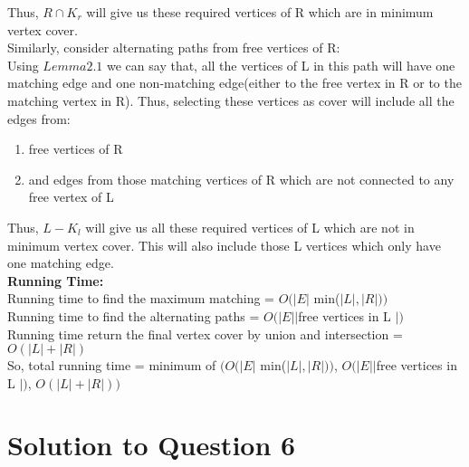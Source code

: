 \documentclass[11pt]{article}
\begin{document}
Thus, $R \cap K_r$ will give us these required vertices of R which are in minimum vertex cover. \\
Similarly, consider alternating paths from free vertices of R: \\
Using $Lemma 2.1$ we can say that, all the vertices of L in this path will have one matching edge and one non-matching edge(either to 
the free vertex in R or to the matching vertex in R). Thus, selecting these vertices as cover will include all the edges from: \\
\begin{enumerate}
	\item free vertices of R
	\item and edges from those matching vertices of R which are not connected to any free vertex of L
\end{enumerate}
Thus, $L - K_l$ will give us all these required vertices of L which are not in minimum vertex cover. This  will also include those L 
vertices which only have one matching edge. \\
\textbf{Running Time:} \\
Running time to find the maximum matching = $O(|E|$ min($|L|, |R|))$ \\
Running time to find the alternating paths = $O(|E| |$free vertices in L $|)$ \\
Running time return the final vertex cover by union and intersection = $O(|L|+|R|)$ \\
So, total running time = minimum of $(O(|E|$ min($|L|, |R|))$, $O(|E| |$free vertices in L $|)$, $O(|L|+|R|))$

\section{Solution to Question 6}
\end{document}
